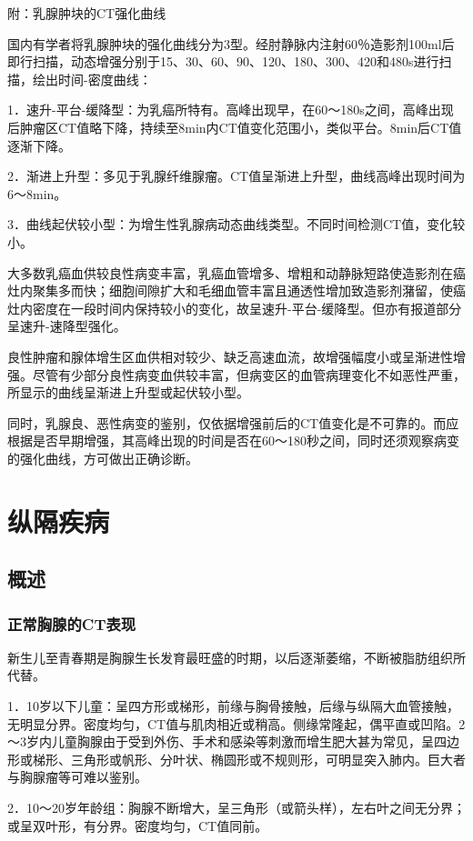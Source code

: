 附：乳腺肿块的CT强化曲线

国内有学者将乳腺肿块的强化曲线分为3型。经肘静脉内注射60％造影剂100ml后即行扫描，动态增强分别于15、30、60、90、120、180、300、420和480s进行扫描，绘出时间-密度曲线：

1．速升-平台-缓降型：为乳癌所特有。高峰出现早，在60～180s之间，高峰出现后肿瘤区CT值略下降，持续至8min内CT值变化范围小，类似平台。8min后CT值逐渐下降。

2．渐进上升型：多见于乳腺纤维腺瘤。CT值呈渐进上升型，曲线高峰出现时间为6～8min。

3．曲线起伏较小型：为增生性乳腺病动态曲线类型。不同时间检测CT值，变化较小。

大多数乳癌血供较良性病变丰富，乳癌血管增多、增粗和动静脉短路使造影剂在癌灶内聚集多而快；细胞间隙扩大和毛细血管丰富且通透性增加致造影剂潴留，使癌灶内密度在一段时间内保持较小的变化，故呈速升-平台-缓降型。但亦有报道部分呈速升-速降型强化。

良性肿瘤和腺体增生区血供相对较少、缺乏高速血流，故增强幅度小或呈渐进性增强。尽管有少部分良性病变血供较丰富，但病变区的血管病理变化不如恶性严重，所显示的曲线呈渐进上升型或起伏较小型。

同时，乳腺良、恶性病变的鉴别，仅依据增强前后的CT值变化是不可靠的。而应根据是否早期增强，其高峰出现的时间是否在60～180秒之间，同时还须观察病变的强化曲线，方可做出正确诊断。

\section{纵隔疾病}

\subsection{概述}

\subsubsection{正常胸腺的CT表现}

新生儿至青春期是胸腺生长发育最旺盛的时期，以后逐渐萎缩，不断被脂肪组织所代替。

1．10岁以下儿童：呈四方形或梯形，前缘与胸骨接触，后缘与纵隔大血管接触，无明显分界。密度均匀，CT值与肌肉相近或稍高。侧缘常隆起，偶平直或凹陷。2～3岁内儿童胸腺由于受到外伤、手术和感染等刺激而增生肥大甚为常见，呈四边形或梯形、三角形或帆形、分叶状、椭圆形或不规则形，可明显突入肺内。巨大者与胸腺瘤等可难以鉴别。

2．10～20岁年龄组：胸腺不断增大，呈三角形（或箭头样），左右叶之间无分界；或呈双叶形，有分界。密度均匀，CT值同前。

